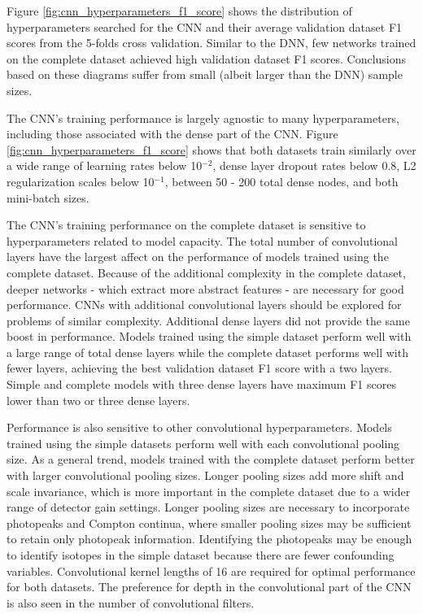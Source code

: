 Figure \ref{fig:cnn_hyperparameters_f1_score} shows the distribution of hyperparameters searched for the CNN and their average validation dataset F1 scores from the 5-folds cross validation. Similar to the DNN, few networks trained on the complete dataset achieved high validation dataset F1 scores. Conclusions based on these diagrams suffer from small (albeit larger than the DNN) sample sizes.

The CNN's training performance is largely agnostic to many hyperparameters, including those associated with the dense part of the CNN. Figure \ref{fig:cnn_hyperparameters_f1_score} shows that both datasets train similarly over a wide range of learning rates below 10$^{-2}$, dense layer dropout rates below 0.8, L2 regularization scales below 10$^{-1}$, between 50 - 200 total dense nodes, and both mini-batch sizes.

The CNN's training performance on the complete dataset is sensitive to hyperparameters related to model capacity. The total number of convolutional layers have the largest affect on the performance of models trained using the complete dataset. Because of the additional complexity in the complete dataset, deeper networks - which extract more abstract features - are necessary for good performance. CNNs with additional convolutional layers should be explored for problems of similar complexity. Additional dense layers did not provide the same boost in performance. Models trained using the simple dataset perform well with a large range of total dense layers while the complete dataset performs well with fewer layers, achieving the best validation dataset F1 score with a two layers. Simple and complete models with three dense layers have maximum F1 scores lower than two or three dense layers.

Performance is also sensitive to other convolutional hyperparameters. Models trained using the simple datasets perform well with each convolutional pooling size. As a general trend, models trained with the complete dataset perform better with larger convolutional pooling sizes. Longer pooling sizes add more shift and scale invariance, which is more important in the complete dataset due to a wider range of detector gain settings. Longer pooling sizes are necessary to incorporate photopeaks and Compton continua, where smaller pooling sizes may be sufficient to retain only photopeak information. Identifying the photopeaks may be enough to identify isotopes in the simple dataset because there are fewer confounding variables. Convolutional kernel lengths of 16 are required for optimal performance for both datasets. The preference for depth in the convolutional part of the CNN is also seen in the number of convolutional filters.

